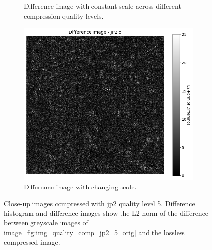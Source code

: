 \begin{figure}[htb]
\begin{subfigure}[b]{0.48\textwidth}
        \caption{Difference image with constant scale across different compression quality levels.}
        \label{fig:img_quality_comp_jp2_5_center_diff}
    \end{subfigure}
    \begin{subfigure}[b]{0.48\textwidth}
        \centering
        \includegraphics[width=\textwidth]{doc/thesis/0_figures/compare_quality/set1/jp2_5_center_diff_heatmap_rel.png}
        \caption{Difference image with changing scale.}
        \label{fig:img_quality_comp_jp2_5_center_diff_rel}
    \end{subfigure}
    \caption{Close-up images compressed with \gls{jp2} quality level 5. Difference histogram and difference images show the L2-norm of the difference between greyscale images of image~\ref{fig:img_quality_comp_jp2_5_orig} and the lossless compressed image.}
    \label{fig:img_quality_comp_jp2_5_center}
\end{figure}

